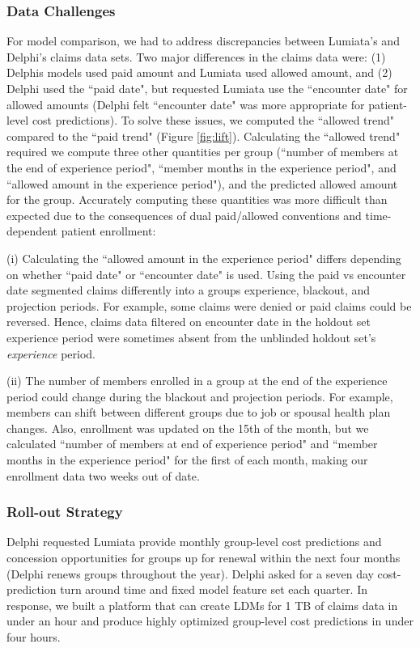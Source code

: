 \documentclass[letterpaper]{article} %
\begin{document}
\subsubsection{Data Challenges}
For model comparison, we had to address discrepancies between Lumiata's and Delphi's claims data sets.  Two major differences in the claims data were:
(1) Delphis models used paid amount and Lumiata used allowed amount, and
(2) Delphi used the ``paid date", but requested Lumiata use the ``encounter date" for allowed amounts (Delphi felt ``encounter date" was more appropriate for patient-level cost predictions).
To solve these issues, we computed the ``allowed trend" compared to the ``paid trend" (Figure \ref{fig:lift}).  Calculating the ``allowed trend" required we compute three other quantities per group (``number of members at the end of experience period", ``member months in the experience period", and ``allowed amount in the experience period"), and the predicted allowed amount for the group.  Accurately computing these quantities was more difficult than expected due to the consequences of dual paid/allowed conventions and time-dependent patient enrollment:

(i) Calculating the ``allowed amount in the experience period" differs depending on whether ``paid date" or ``encounter date" is used. Using the paid vs encounter date segmented claims differently into a groups experience, blackout, and projection periods. For example, some claims were denied or paid claims could be reversed.  Hence, claims data filtered on encounter date in the holdout set experience period were sometimes absent from the unblinded holdout set's \textit{experience} period.

(ii)  The number of members enrolled in a group at the end of the experience period could change during the blackout and projection periods.  For example, members can shift between different groups due to job or spousal health plan changes. Also, enrollment was updated on the 15th of the month, but we calculated ``number of members at end of experience period" and ``member months in the experience period" for the first of each month, making our enrollment data two weeks out of date.

\subsubsection{Roll-out Strategy}\label{sec:deployment}
Delphi requested Lumiata provide monthly group-level cost predictions and concession opportunities for groups up for renewal within the next four months (Delphi renews groups throughout the year).  Delphi asked for a seven day cost-prediction turn around time and fixed model feature set each quarter.  In response, we built a platform that can create LDMs for 1 TB of claims data in under an hour and produce highly optimized group-level cost predictions in under four hours.
\end{document}
